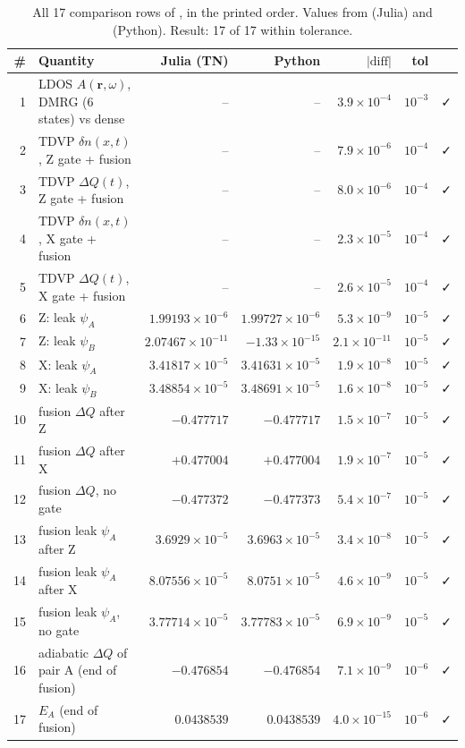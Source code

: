 \begin{table}[H]
\centering
\small\setlength{\tabcolsep}{4pt}
\caption{All 17 comparison rows of , in the printed order. Values from 
(Julia) and  (Python). Result: 17 of 17 within tolerance.}
\label{tab:compare}
\begin{tabular}{rlrrrrc}
\toprule
\# & Quantity & Julia (TN) & Python & $|\text{diff}|$ & tol & \\
\midrule
1 & LDOS $A(\mathbf r,\omega)$, DMRG (6 states) vs dense & -- & -- & $3.9\times10^{-4}$ & $10^{-3}$ & ✓\\
2 & TDVP $\delta n(x,t)$, Z gate + fusion & -- & -- & $7.9\times10^{-6}$ & $10^{-4}$ & ✓\\
3 & TDVP $\Delta Q(t)$, Z gate + fusion & -- & -- & $8.0\times10^{-6}$ & $10^{-4}$ & ✓\\
4 & TDVP $\delta n(x,t)$, X gate + fusion & -- & -- & $2.3\times10^{-5}$ & $10^{-4}$ & ✓\\
5 & TDVP $\Delta Q(t)$, X gate + fusion & -- & -- & $2.6\times10^{-5}$ & $10^{-4}$ & ✓\\
6 & Z: leak $\psi_A$ & $1.99193\times10^{-6}$ & $1.99727\times10^{-6}$ & $5.3\times10^{-9}$ & $10^{-5}$ & ✓\\
7 & Z: leak $\psi_B$ & $2.07467\times10^{-11}$ & $-1.33\times10^{-15}$ & $2.1\times10^{-11}$ & $10^{-5}$ & ✓\\
8 & X: leak $\psi_A$ & $3.41817\times10^{-5}$ & $3.41631\times10^{-5}$ & $1.9\times10^{-8}$ & $10^{-5}$ & ✓\\
9 & X: leak $\psi_B$ & $3.48854\times10^{-5}$ & $3.48691\times10^{-5}$ & $1.6\times10^{-8}$ & $10^{-5}$ & ✓\\
10 & fusion $\Delta Q$ after Z & $-0.477717$ & $-0.477717$ & $1.5\times10^{-7}$ & $10^{-5}$ & ✓\\
11 & fusion $\Delta Q$ after X & $+0.477004$ & $+0.477004$ & $1.9\times10^{-7}$ & $10^{-5}$ & ✓\\
12 & fusion $\Delta Q$, no gate & $-0.477372$ & $-0.477373$ & $5.4\times10^{-7}$ & $10^{-5}$ & ✓\\
13 & fusion leak $\psi_A$ after Z & $3.6929\times10^{-5}$ & $3.6963\times10^{-5}$ & $3.4\times10^{-8}$ & $10^{-5}$ & ✓\\
14 & fusion leak $\psi_A$ after X & $8.07556\times10^{-5}$ & $8.0751\times10^{-5}$ & $4.6\times10^{-9}$ & $10^{-5}$ & ✓\\
15 & fusion leak $\psi_A$, no gate & $3.77714\times10^{-5}$ & $3.77783\times10^{-5}$ & $6.9\times10^{-9}$ & $10^{-5}$ & ✓\\
16 & adiabatic $\Delta Q$ of pair A (end of fusion) & $-0.476854$ & $-0.476854$ & $7.1\times10^{-9}$ & $10^{-6}$ & ✓\\
17 & $E_A$ (end of fusion) & $0.0438539$ & $0.0438539$ & $4.0\times10^{-15}$ & $10^{-6}$ & ✓\\
\bottomrule
\end{tabular}
\end{table}


